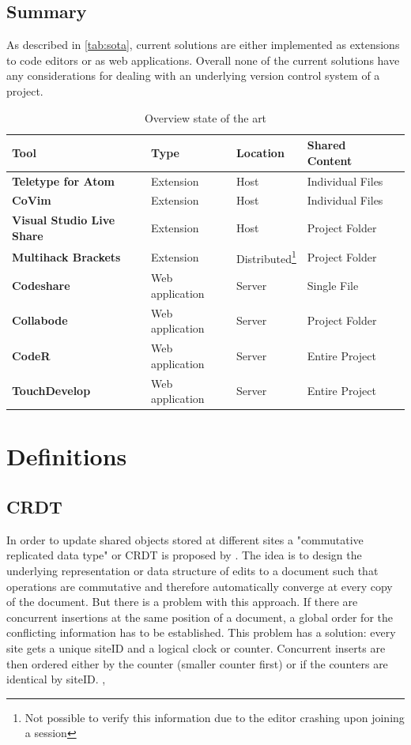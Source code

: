 \newpage
\subsection{Summary}
As described in \autoref{tab:sota}, current solutions are either implemented as extensions to code editors or as web applications. Overall none of the current solutions have any considerations for dealing with an underlying version control system of a project.
\begin{table}
	\begin{minipage}{6cm}
		\begin{tabular}{| >{\bfseries}l | l | l | l | l | }
			\hline
				\rowcolor{orange} \bfseries Tool & \bfseries Type & \bfseries Location & \bfseries Shared Content \\
			\hline
			\hline
				Teletype for Atom & Extension & Host & Individual Files \\\hline
				CoVim & Extension & Host & Individual Files \\\hline
				Visual Studio Live Share & Extension & Host & Project Folder \\\hline
				Multihack Brackets & Extension &  Distributed\footnote{Not possible to verify this information due to the editor crashing upon joining a session} & Project Folder \\\hline
				Codeshare & Web application & Server & Single File \\\hline
				Collabode & Web application & Server & Project Folder \\\hline
				CodeR & Web application & Server & Entire Project \\\hline
				TouchDevelop & Web application & Server & Entire Project \\
			\hline
		\end{tabular}
	\end{minipage}
		\caption{Overview state of the art}
		\label{tab:sota}
	\end{table}

\section{Definitions}

\subsection{CRDT}
\label{sec:CRDT}
In order to update shared objects stored at different sites a "commutative replicated data type" or CRDT is proposed by \cite{PreguicaMarquesShapiroLetia:2009}. The idea is to design the underlying representation or data structure of edits to a document such that operations are commutative and therefore automatically converge at every copy of the document.
But there is a problem with this approach. If there are concurrent insertions at the same position of a document, a global order for the conflicting information has to be established. This problem has a solution: every site gets a unique siteID and a logical clock or counter. Concurrent inserts are then ordered either by the counter (smaller counter first) or if the counters are identical by siteID. \cite{PreguicaMarquesShapiroLetia:2009}, \cite{Oster:2006:DataconsistencyforP2Pcollaborativeediting}

